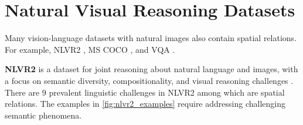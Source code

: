 \section{Natural Visual Reasoning Datasets}

Many vision-language datasets with natural images also contain spatial relations. For example, NLVR2 \cite{suhr2018corpus}, MS COCO \cite{lin2014microsoft}, and VQA \cite{antol2015vqa}.

\textbf{NLVR2} is a dataset for joint reasoning about natural language and images, with a focus on semantic diversity, compositionality, and visual reasoning challenges \cite{suhr2018corpus}. There are 9 prevalent linguistic challenges in NLVR2 among which are spatial relations.
The examples in \cref{fig:nlvr2_examples} require addressing challenging semantic phenomena.

